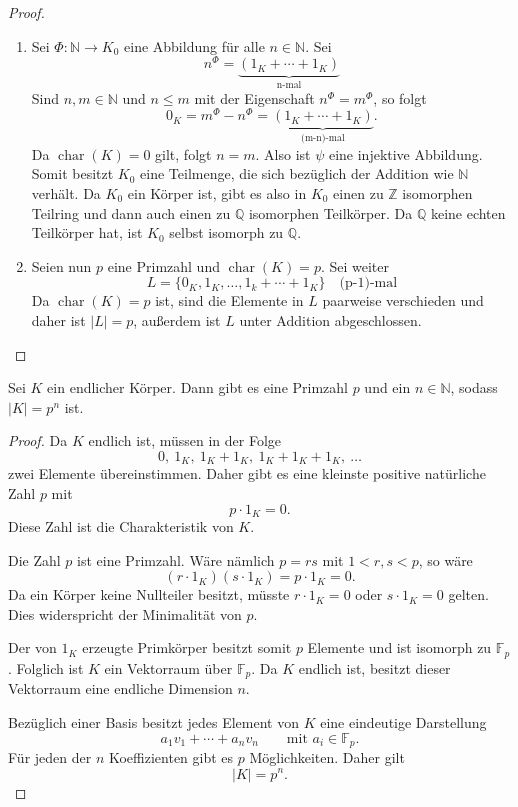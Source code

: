 \begin{proof}
    \begin{enumerate}
        \item Sei \(\Phi:\mathbb{N}\rightarrow K_0\) eine Abbildung für alle $n\in\mathbb{N}$. Sei
              \[
                  n^\Phi =\underbrace{(1_K+\cdots+1_K)}_{\text{n-mal}}
              \]
              Sind $n,m\in\mathbb{N}$ und $n\leq m$ mit der Eigenschaft $n^\Phi=m^\Phi$, so folgt
              \[
                  0_K=m^\Phi-n^\Phi=\underbrace{(1_K+\cdots+1_K)}_{\text{(m-n)-mal}}.
              \]
              Da \(\operatorname{char}(K)=0\) gilt, folgt $n=m$. Also ist $\psi$ eine injektive Abbildung. Somit besitzt $K_0$ eine Teilmenge, die sich bezüglich der Addition wie $\mathbb{N}$ verhält. Da $K_0$ ein Körper ist, gibt es also in $K_0$ einen zu $\mathbb{Z}$ isomorphen Teilring und dann auch einen zu $\mathbb{Q}$ isomorphen Teilkörper. Da $\mathbb{Q}$ keine echten Teilkörper hat, ist $K_0$ selbst isomorph zu $\mathbb{Q}$.
        \item Seien nun $p$ eine Primzahl und \(\operatorname{char}(K) = p\). Sei weiter
              \[
                  L = \{0_K,1_K,\dots,1_k+\cdots+1_K\}\quad \text{(p-1)-mal}
              \]
              Da \(\operatorname{char}(K)=p\) ist, sind die Elemente in $L$ paarweise verschieden und daher ist $|L|=p$, außerdem ist $L$ unter Addition abgeschlossen.
    \end{enumerate}
\end{proof}

\begin{satz}
    Sei $K$ ein endlicher Körper. Dann gibt es eine Primzahl $p$ und ein $n\in \mathbb{N}$, sodass \(|K|=p^n\) ist.
\end{satz}

\begin{proof}
    Da \(K\) endlich ist, müssen in der Folge
    \[
        0,\ 1_K,\ 1_K+1_K,\ 1_K+1_K+1_K,\ \dots
    \]
    zwei Elemente übereinstimmen. Daher gibt es eine kleinste positive
    natürliche Zahl \(p\) mit
    \[
        p\cdot 1_K=0.
    \]
    Diese Zahl ist die Charakteristik von \(K\).

    Die Zahl \(p\) ist eine Primzahl. Wäre nämlich \(p=rs\) mit
    \(1<r,s<p\), so wäre
    \[
        (r\cdot 1_K)(s\cdot 1_K)=p\cdot 1_K=0.
    \]
    Da ein Körper keine Nullteiler besitzt, müsste
    \(r\cdot 1_K=0\) oder \(s\cdot 1_K=0\) gelten. Dies widerspricht
    der Minimalität von \(p\).

    Der von \(1_K\) erzeugte Primkörper besitzt somit \(p\) Elemente
    und ist isomorph zu \(\mathbb{F}_p\). Folglich ist \(K\) ein
    Vektorraum über \(\mathbb{F}_p\). Da \(K\) endlich ist, besitzt
    dieser Vektorraum eine endliche Dimension \(n\).

    Bezüglich einer Basis besitzt jedes Element von \(K\) eine
    eindeutige Darstellung
    \[
        a_1v_1+\cdots+a_n v_n
        \qquad\text{mit }a_i\in\mathbb{F}_p.
    \]
    Für jeden der \(n\) Koeffizienten gibt es \(p\) Möglichkeiten.
    Daher gilt
    \[
        |K|=p^n.
    \]
\end{proof}


